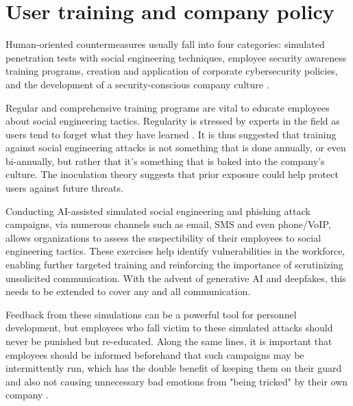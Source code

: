 
\section{User training and company policy}
\begin{comment}
    
    - The best defense against SE attacks is an educated, conscious user
    - User education should be continuous and not a one-off event

\end{comment}

Human-oriented countermeasures usually fall into four categories: simulated penetration tests with social engineering techniques, employee security awareness training programs, creation and application of corporate cybersecurity policies, and the development of a security-conscious company culture \citep{tsinganosTowardsAnAutomatedRecognitionSystem2018, mitnickArtDeceptionControlling2003}.

Regular and comprehensive training programs are vital to educate employees about social engineering tactics. Regularity is stressed by experts in the field as users tend to forget what they have learned \citep{hadnagySocialEngineering2018, mitnickArtDeceptionControlling2003}. It is thus suggested that training against social engineering attacks is not something that is done annually, or even bi-annually, but rather that it's something that is baked into the company's culture. The inoculation theory \citep{blauthArtificialIntelligenceCrime2022} suggests that prior exposure could help protect users against future threats.

Conducting AI-assisted simulated social engineering and phishing attack campaigns, via numerous channels such as email, SMS and even phone/VoIP, allows organizations to assess the suspectibility of their employees to social engineering tactics. These exercises help identify vulnerabilities in the workforce, enabling further targeted training and reinforcing the importance of scrutinizing unsolicited communication. With the advent of generative AI and deepfakes, this needs to be extended to cover any and all communication.

Feedback from these simulations can be a powerful tool for personnel development, but employees who fall victim to these simulated attacks should never be punished but re-educated. Along the same lines, it is important that employees should be informed beforehand that such campaigns may be intermittently run, which has the double benefit of keeping them on their guard and also not causing unnecessary bad emotions from "being tricked" by their own company \citep{hadnagySocialEngineering2018, mitnickArtDeceptionControlling2003}.

